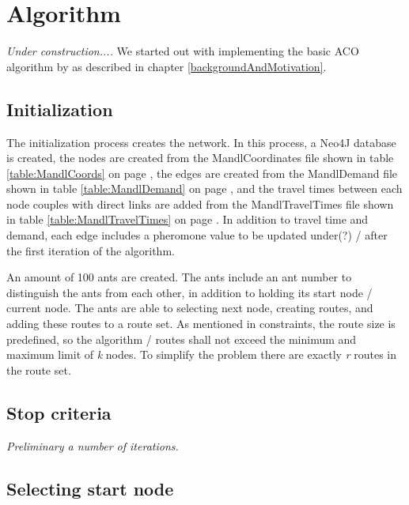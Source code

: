 \section{Algorithm}

\textit{Under construction....}
\newline
We started out with implementing the basic ACO algorithm by \citet{nanda11} as described in chapter \ref{backgroundAndMotivation}.

\subsection{Initialization}

The initialization process creates the network. In this process, a Neo4J database is created, the nodes are created from the MandlCoordinates file shown in table \ref{table:MandlCoords} on page \pageref{table:MandlCoords}, the edges are created from the MandlDemand file shown in table \ref{table:MandlDemand} on page \pageref{table:MandlDemand}, and the travel times between each node couples with direct links are added from the MandlTravelTimes file shown in table \ref{table:MandlTravelTimes} on page \pageref{table:MandlTravelTimes}. In addition to travel time and demand, each edge includes a pheromone value to be updated under(?) / after the first iteration of the algorithm.
\par
An amount of 100 ants are created. The ants include an ant number to distinguish the ants from each other, in addition to holding its start node / current node. The ants are able to selecting next node, creating routes, and adding these routes to a route set. As mentioned in constraints, the route size is predefined, so the algorithm / routes shall not exceed the minimum and maximum limit of \textit{k} nodes. To simplify the problem there are exactly \textit{r} routes in the route set.

\subsection{Stop criteria}

\textit{Preliminary a number of iterations. }

\subsection{Selecting start node}
\begin{algorithm}[H]

 
\end{algorithm}

